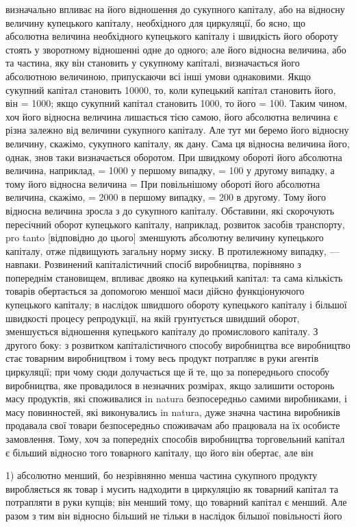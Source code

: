 \parcont{}  %
визначально впливає на його відношення до сукупного капіталу,
або на відносну величину купецького капіталу, необхідного для
циркуляції, бо ясно, що абсолютна величина необхідного купецького
капіталу і швидкість його обороту стоять у зворотному
відношенні одне до одного; але його відносна величина, або та
частина, яку він становить у сукупному капіталі, визначається
його абсолютною величиною, припускаючи всі інші умови
однаковими. Якщо сукупний капітал становить \num{10000}, то, коли
купецький капітал становить  його, він = 1000; якщо сукупний
капітал становить 1000, то   його = 100. Таким чином, хоч
його відносна величина лишається тією самою, його абсолютна
величина є різна залежно від величини сукупного капіталу. Але
тут ми беремо його відносну величину, скажімо,   сукупного капіталу,
як дану. Сама ця відносна величина його, однак, знов таки
визначається оборотом. При швидкому обороті його абсолютна величина,
наприклад, = 1000 у першому випадку,
= 100 у другому випадку, а тому його відносна величина = 
При повільнішому обороті його абсолютна величина, скажімо, =
2000 в першому випадку, = 200 в другому. Тому його відносна
величина зросла з   до  сукупного капіталу. Обставини,
які скорочують пересічний оборот купецького капіталу, наприклад,
розвиток засобів транспорту, pro tanto [відповідно до цього]
зменшують абсолютну величину купецького капіталу, отже
підвищують загальну норму зиску. В протилежному випадку, —
навпаки. Розвинений капіталістичний спосіб виробництва, порівняно
з попереднім становищем, впливає двояко на купецький
капітал: та сама кількість товарів обертається за допомогою
меншої маси дійсно функціонуючого купецького капіталу; в наслідок
швидшого обороту купецького капіталу і більшої швидкості
процесу репродукції, на якій грунтується швидший оборот,
зменшується відношення купецького капіталу до промислового
капіталу. З другого боку: з розвитком капіталістичного способу
виробництва все виробництво стає товарним виробництвом і тому
весь продукт потрапляє в руки агентів циркуляції; при чому
сюди долучається ще й те, що за попереднього способу виробництва,
яке провадилося в незначних розмірах, якщо залишити
осторонь масу продуктів, які споживалися in natura безпосередньо
самими виробниками, і масу повинностей, які виконувались
in natura, дуже значна частина виробників продавала свої
товари безпосередньо споживачам або працювала на їх особисте
замовлення. Тому, хоч за попередніх способів виробництва торговельний
капітал є більший відносно того товарного капіталу,
що його він обертає, але він

1) абсолютно менший, бо незрівнянно менша частина сукупного
продукту виробляється як товар і мусить надходити в циркуляцію
як товарний капітал та потрапляти в руки купців; він менший
тому, що товарний капітал є менший. Але разом з тим він відносно
більший не тільки в наслідок більшої повільності його
\parbreak{}  %
